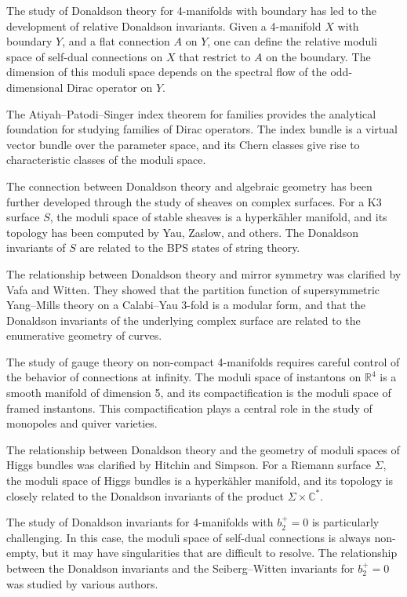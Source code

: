 The study of Donaldson theory for 4-manifolds with boundary has led to the development of relative Donaldson invariants. Given a 4-manifold $X$ with boundary $Y$, and a flat connection $A$ on $Y$, one can define the relative moduli space of self-dual connections on $X$ that restrict to $A$ on the boundary. The dimension of this moduli space depends on the spectral flow of the odd-dimensional Dirac operator on $Y$.

The Atiyah--Patodi--Singer index theorem for families provides the analytical foundation for studying families of Dirac operators. The index bundle is a virtual vector bundle over the parameter space, and its Chern classes give rise to characteristic classes of the moduli space.

The connection between Donaldson theory and algebraic geometry has been further developed through the study of sheaves on complex surfaces. For a K3 surface $S$, the moduli space of stable sheaves is a hyperkähler manifold, and its topology has been computed by Yau, Zaslow, and others. The Donaldson invariants of $S$ are related to the BPS states of string theory.

The relationship between Donaldson theory and mirror symmetry was clarified by Vafa and Witten. They showed that the partition function of supersymmetric Yang--Mills theory on a Calabi--Yau 3-fold is a modular form, and that the Donaldson invariants of the underlying complex surface are related to the enumerative geometry of curves.

The study of gauge theory on non-compact 4-manifolds requires careful control of the behavior of connections at infinity. The moduli space of instantons on $\mathbb{R}^4$ is a smooth manifold of dimension 5, and its compactification is the moduli space of framed instantons. This compactification plays a central role in the study of monopoles and quiver varieties.

The relationship between Donaldson theory and the geometry of moduli spaces of Higgs bundles was clarified by Hitchin and Simpson. For a Riemann surface $\Sigma$, the moduli space of Higgs bundles is a hyperkähler manifold, and its topology is closely related to the Donaldson invariants of the product $\Sigma \times \mathbb{C}^*$.

The study of Donaldson invariants for 4-manifolds with $b_2^+ = 0$ is particularly challenging. In this case, the moduli space of self-dual connections is always non-empty, but it may have singularities that are difficult to resolve. The relationship between the Donaldson invariants and the Seiberg--Witten invariants for $b_2^+ = 0$ was studied by various authors.

